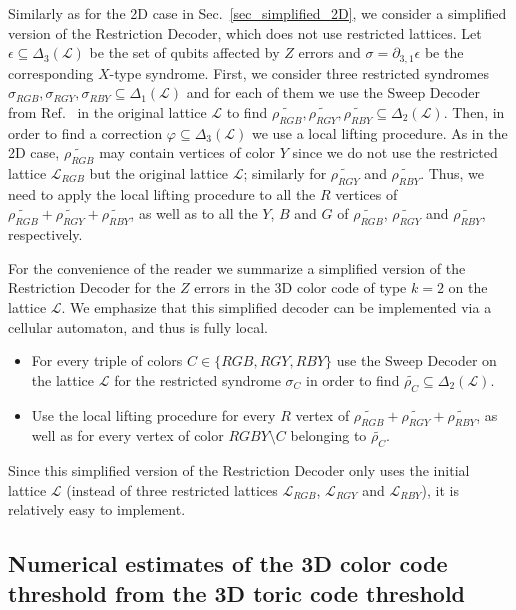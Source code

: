 \documentclass[onecolumn,letterpaper,11pt,accepted=2022-12-19]{quantumarticle}
\newcommand{\face}[2]{{\Delta_{#1}(#2)}}
\newcommand{\bnd}[2]{\partial_{#1,#2}}
\renewcommand{\phi}{\varphi}
\theoremstyle{definition}
\theoremstyle{lemma}
\theoremstyle{theorem}
\theoremstyle{corollary}
\begin{document}
{Similarly as for the 2D case in Sec.~\ref{sec_simplified_2D}, we consider a simplified version of the Restriction Decoder, which does not use restricted lattices.
Let $\epsilon \subseteq \face 3 {\mathcal{L}}$ be the set of qubits affected by $Z$ errors and $\sigma = \bnd 3 1 \epsilon$  be the corresponding $X$-type syndrome.
First, we consider three restricted syndromes $\sigma_{RGB}, \sigma_{RGY}, \sigma_{RBY}\subseteq \face 1 {\mathcal{L}}$ and for each of them we use the Sweep Decoder from Ref.~\cite{Kubica2018toom} in the original lattice $\mathcal{L}$ to find $\widetilde{\rho_{RGB}},\widetilde{\rho_{RGY}},\widetilde{\rho_{RBY}}\subseteq \face 2 {\mathcal{L}}$.
Then, in order to find a correction $\phi \subseteq \face 3 {\mathcal{L}}$ we use a local lifting procedure.
As in the 2D case, $\widetilde{\rho_{RGB}}$ may contain vertices of color $Y$ since we do not use the restricted lattice $\mathcal{L}_{RGB}$ but the original lattice $\mathcal{L}$; similarly for $\widetilde{\rho_{RGY}}$ and $\widetilde{\rho_{RBY}}$.
Thus, we need to apply the local lifting procedure to all the $R$ vertices of $\widetilde{\rho_{RGB}} + \widetilde{\rho_{RGY}} + \widetilde{\rho_{RBY}}$, as well as to all the $Y$, $B$ and $G$ of $\widetilde{\rho_{RGB}}$, $\widetilde{\rho_{RGY}}$ and $\widetilde{\rho_{RBY}}$, respectively.


For the convenience of the reader we summarize a simplified version of the Restriction Decoder for the $Z$ errors in the 3D color code of type $k=2$ on the lattice $\mathcal{L}$.
We emphasize that this simplified decoder can be implemented via a cellular automaton, and thus is fully local.
\begin{itemize}
\item For every triple of colors $C \in \{ RGB, RGY, RBY \}$ use the Sweep Decoder on the lattice $\mathcal{L}$ for the restricted syndrome $\sigma_{C}$ in order to find $\widetilde{\rho_{C}}\subseteq\face 2 {\mathcal{L}}$.
\item Use the local lifting procedure for every $R$ vertex of $\widetilde{\rho_{RGB}} + \widetilde{\rho_{RGY}} + \widetilde{\rho_{RBY}}$, as well as for every vertex of color $RGBY\setminus C$ belonging to $\widetilde{\rho_{C}}$.
\end{itemize}
Since this simplified version of the Restriction Decoder only uses the initial lattice $\mathcal{L}$ (instead of three restricted lattices $\mathcal{L}_{RGB}$, $\mathcal{L}_{RGY}$ and $\mathcal{L}_{RBY}$), it is relatively easy to implement.


\subsection{Numerical estimates of the 3D color code threshold from the 3D toric code threshold}


}
\end{document}

